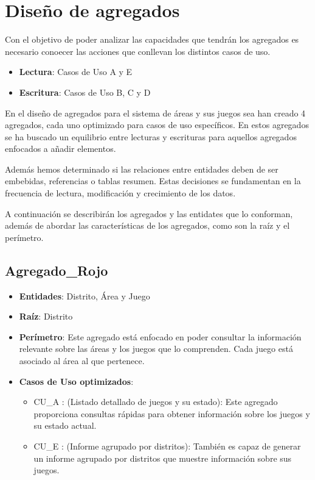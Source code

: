 \documentclass[]{article}
\begin{document}
\section{Diseño de agregados}
\label{sec:agregados}
Con el objetivo de poder analizar las capacidades que tendrán los agregados es necesario conoecer las acciones que conllevan los distintos casos de uso.
\begin{itemize}
    \item \textbf{Lectura}: Casos de Uso A y E
    \item \textbf{Escritura}: Casos de Uso B, C y D
\end{itemize}

En el diseño de agregados para el sistema de áreas y sus juegos sea han creado 4 agregados, cada uno optimizado para casos de uso específicos. En estos agregados se ha buscado un equilibrio entre lecturas y escrituras para aquellos agregados enfocados a añadir elementos.

Además hemos determinado si las relaciones entre entidades deben de ser embebidas, referencias o tablas resumen. Estas decisiones se fundamentan en la frecuencia de lectura, modificación y crecimiento de los datos.

A continuación se describirán los agregados y las entidates que lo conforman, además de abordar las características de los agregados, como son la raíz y el perímetro.

\subsection{Agregado_Rojo}
\label{sub_sec:agregado_rojo}
\begin{itemize}
    \item \textbf{Entidades}: Distrito, Área y Juego
    \item \textbf{Raíz}: Distrito
    \item \textbf{Perímetro}: Este agregado está enfocado en poder consultar la información relevante sobre las áreas y los juegos que lo comprenden. Cada juego está asociado al área al que pertenece.
    \item \textbf{Casos de Uso optimizados}:
    \begin{itemize}
        \item CU\_A : (Listado detallado de juegos y su estado): Este agregado proporciona consultas rápidas para obtener información sobre los juegos y su estado actual.
        \item CU\_E : (Informe agrupado por distritos): También es capaz de generar un informe agrupado por distritos que muestre información sobre sus juegos. 
    \end{itemize}
\end{itemize}
\end{document}
